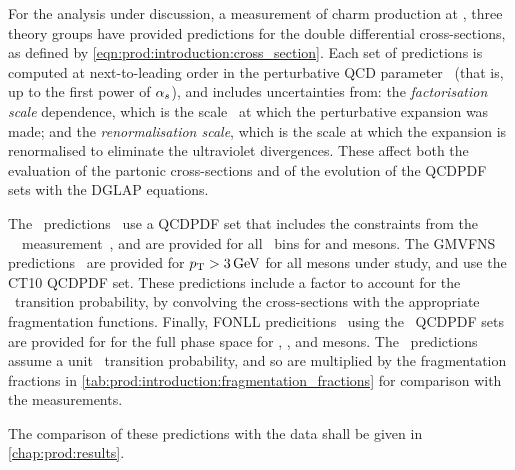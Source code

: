 For the analysis under discussion, a measurement of charm production at 
, three theory groups have provided predictions for the double 
differential cross-sections, as defined by 
\cref{eqn:prod:introduction:cross_section}.
Each set of predictions is computed at next-to-leading order in the 
perturbative \ac{QCD} parameter \alphas\ (that is, up to the first power of 
$\alpha_{s}$), and includes uncertainties from: the \emph{factorisation scale} 
dependence, which is the scale \pdfqsquared\ at which the perturbative 
expansion was made; and the \emph{renormalisation scale}, which is the scale at 
which the expansion is renormalised to eliminate the ultraviolet divergences.
These affect both the evaluation of the partonic cross-sections and of the 
evolution of the \ac{QCDPDF} sets with the \ac{DGLAP} equations.

The \nnpdfl\ predictions~\cite{Gauld:2015yia} use a \ac{QCDPDF} set that 
includes the constraints from the \ \lhcb\ 
measurement~\cite{LHCb-PAPER-2012-041}, and are provided for all \pTy\ bins for 
\PDz and \PDp mesons.
The \ac{GMVFNS} predictions~\cite{Kniehl:2012ti} are provided for $\pT > 
\SI{3}{\GeV}$ for all mesons under study, and use the CT10 \ac{QCDPDF} set.
These predictions include a factor to account for the \cToHc\ transition 
probability, by convolving the \decay{\ccbar}{\PHc} cross-sections with the 
appropriate fragmentation functions.
Finally, \ac{FONLL} predicitions~\cite{Cacciari:2015fta} using the \nnpdf\ 
\ac{QCDPDF} sets are provided for for the full \pTy phase space for \PDz, \PDp, 
and \PDstarp mesons.
The \fonll\ predictions assume a unit \cToHc\ transition probability, and so 
are multiplied by the fragmentation fractions in 
\cref{tab:prod:introduction:fragmentation_fractions} for comparison with the 
measurements.

The comparison of these predictions with the data shall be given in 
\cref{chap:prod:results}.

